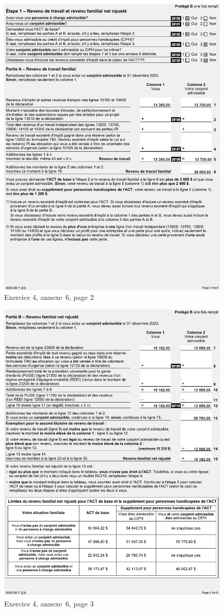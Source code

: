 \begin{figure}
	\centering
	\includegraphics[width=.9\textwidth]{exercice/7-4/Q4/Annexe6p2.png}
	\caption[]{Exercice 4, annexe~6, page 2}
	\label{fig:chap7Exercice4Annexe6p2}
\end{figure}
\begin{figure}
	\centering
	\includegraphics[width=.9\textwidth]{exercice/7-4/Q4/Annexe6p3.png}
	\caption[]{Exercice 4, annexe~6, page 3}
	\label{fig:chap7Exercice4Annexe6p3}
\end{figure}
